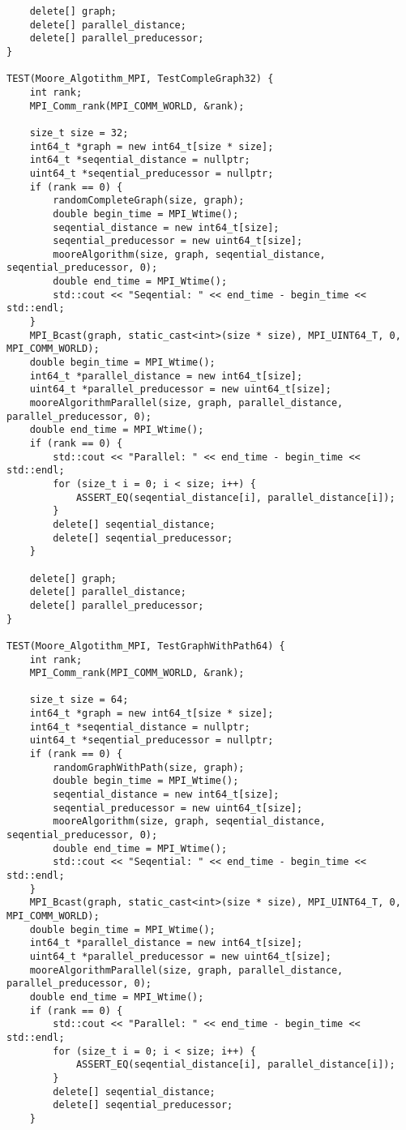 \documentclass{report}
\begin{document}
\begin{lstlisting}
    delete[] graph;
    delete[] parallel_distance;
    delete[] parallel_preducessor;
}

TEST(Moore_Algotithm_MPI, TestCompleGraph32) {
    int rank;
    MPI_Comm_rank(MPI_COMM_WORLD, &rank);

    size_t size = 32;
    int64_t *graph = new int64_t[size * size];
    int64_t *seqential_distance = nullptr;
    uint64_t *seqential_preducessor = nullptr;
    if (rank == 0) {
        randomCompleteGraph(size, graph);
        double begin_time = MPI_Wtime();
        seqential_distance = new int64_t[size];
        seqential_preducessor = new uint64_t[size];
        mooreAlgorithm(size, graph, seqential_distance, seqential_preducessor, 0);
        double end_time = MPI_Wtime();
        std::cout << "Seqential: " << end_time - begin_time << std::endl;
    }
    MPI_Bcast(graph, static_cast<int>(size * size), MPI_UINT64_T, 0, MPI_COMM_WORLD);
    double begin_time = MPI_Wtime();
    int64_t *parallel_distance = new int64_t[size];
    uint64_t *parallel_preducessor = new uint64_t[size];
    mooreAlgorithmParallel(size, graph, parallel_distance, parallel_preducessor, 0);
    double end_time = MPI_Wtime();
    if (rank == 0) {
        std::cout << "Parallel: " << end_time - begin_time << std::endl;
        for (size_t i = 0; i < size; i++) {
            ASSERT_EQ(seqential_distance[i], parallel_distance[i]);
        }
        delete[] seqential_distance;
        delete[] seqential_preducessor;
    }

    delete[] graph;
    delete[] parallel_distance;
    delete[] parallel_preducessor;
}

TEST(Moore_Algotithm_MPI, TestGraphWithPath64) {
    int rank;
    MPI_Comm_rank(MPI_COMM_WORLD, &rank);

    size_t size = 64;
    int64_t *graph = new int64_t[size * size];
    int64_t *seqential_distance = nullptr;
    uint64_t *seqential_preducessor = nullptr;
    if (rank == 0) {
        randomGraphWithPath(size, graph);
        double begin_time = MPI_Wtime();
        seqential_distance = new int64_t[size];
        seqential_preducessor = new uint64_t[size];
        mooreAlgorithm(size, graph, seqential_distance, seqential_preducessor, 0);
        double end_time = MPI_Wtime();
        std::cout << "Seqential: " << end_time - begin_time << std::endl;
    }
    MPI_Bcast(graph, static_cast<int>(size * size), MPI_UINT64_T, 0, MPI_COMM_WORLD);
    double begin_time = MPI_Wtime();
    int64_t *parallel_distance = new int64_t[size];
    uint64_t *parallel_preducessor = new uint64_t[size];
    mooreAlgorithmParallel(size, graph, parallel_distance, parallel_preducessor, 0);
    double end_time = MPI_Wtime();
    if (rank == 0) {
        std::cout << "Parallel: " << end_time - begin_time << std::endl;
        for (size_t i = 0; i < size; i++) {
            ASSERT_EQ(seqential_distance[i], parallel_distance[i]);
        }
        delete[] seqential_distance;
        delete[] seqential_preducessor;
    }


\end{lstlisting}
\end{document}
